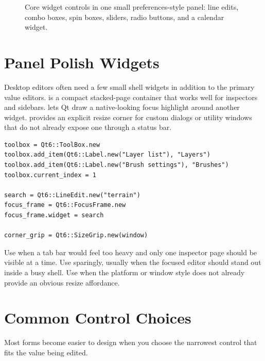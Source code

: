 \begin{figure}[htbp]
  \centering
  \caption{Core widget controls in one small preferences-style panel: line edits, combo boxes, spin boxes, sliders, radio buttons, and a calendar widget.}
\end{figure}

\section{Panel Polish Widgets}

Desktop editors often need a few small shell widgets in addition to the primary value editors.  is a compact stacked-page container that works well for inspectors and sidebars.  lets Qt draw a native-looking focus highlight around another widget.  provides an explicit resize corner for custom dialogs or utility windows that do not already expose one through a status bar.

\begin{lstlisting}[style=crystal]
toolbox = Qt6::ToolBox.new
toolbox.add_item(Qt6::Label.new("Layer list"), "Layers")
toolbox.add_item(Qt6::Label.new("Brush settings"), "Brushes")
toolbox.current_index = 1

search = Qt6::LineEdit.new("terrain")
focus_frame = Qt6::FocusFrame.new
focus_frame.widget = search

corner_grip = Qt6::SizeGrip.new(window)
\end{lstlisting}

Use  when a tab bar would feel too heavy and only one inspector page should be visible at a time. Use  sparingly, usually when the focused editor should stand out inside a busy shell. Use  when the platform or window style does not already provide an obvious resize affordance.

\section{Common Control Choices}

Most forms become easier to design when you choose the narrowest control that fits the value being edited.

